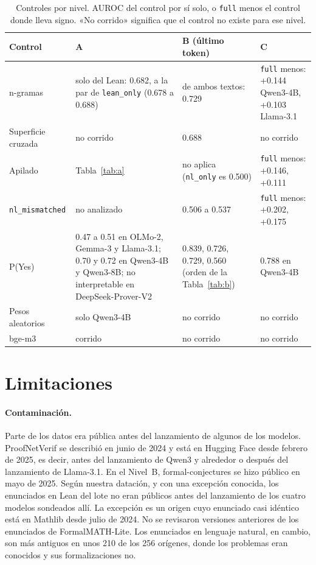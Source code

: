 \documentclass[10pt]{article}
\newcommand{\vr}[1]{\texttt{#1}}
\begin{document}
\begin{table}[h]
\centering
\caption{Controles por nivel. AUROC del control por sí solo, o \vr{full} menos el control donde lleva signo. «No corrido» significa que el control no existe para ese nivel.}
\label{tab:controlesnivel}
\vspace{2pt}
{\small
\begin{tabularx}{\linewidth}{@{}lXXX@{}}
\toprule
Control & A & B (último token) & C\\
\midrule
n-gramas & solo del Lean: 0.682, a la par de \vr{lean\_only} (0.678 a 0.688) & de ambos textos: 0.729 & \vr{full} menos: +0.144 Qwen3-4B, +0.103 Llama-3.1\\
Superficie cruzada & no corrido & 0.688 & no corrido\\
Apilado & Tabla~\ref{tab:a} & no aplica (\vr{nl\_only} es 0.500) & \vr{full} menos: +0.146, +0.111\\
\vr{nl\_mismatched} & no analizado & 0.506 a 0.537 & \vr{full} menos: +0.202, +0.175\\
P(Yes) & 0.47 a 0.51 en OLMo-2, Gemma-3 y Llama-3.1; 0.70 y 0.72 en Qwen3-4B y Qwen3-8B; no interpretable en DeepSeek-Prover-V2 & 0.839, 0.726, 0.729, 0.560 (orden de la Tabla~\ref{tab:b}) & 0.788 en Qwen3-4B\\
Pesos aleatorios & solo Qwen3-4B & no corrido & no corrido\\
bge-m3 & corrido & no corrido & no corrido\\
\bottomrule
\end{tabularx}}
\end{table}

\section{Limitaciones}

\paragraph{Contaminación.}
Parte de los datos era pública antes del lanzamiento de algunos de los modelos. ProofNetVerif se describió en junio
de 2024 y está en Hugging Face desde febrero de 2025, es decir, antes del lanzamiento de Qwen3 y alrededor o
después del lanzamiento de Llama-3.1. En el Nivel~B, formal-conjectures se hizo público en mayo de 2025. Según
nuestra datación, y con una excepción conocida, los enunciados en Lean del lote no eran públicos antes del
lanzamiento de los cuatro modelos sondeados allí. La excepción es un origen cuyo enunciado casi idéntico está en
Mathlib desde julio de 2024. No se revisaron versiones anteriores de los enunciados de FormalMATH-Lite. Los
enunciados en lenguaje natural, en cambio, son más antiguos en unos 210 de los 256 orígenes, donde los problemas
eran conocidos y sus formalizaciones no.
\end{document}
